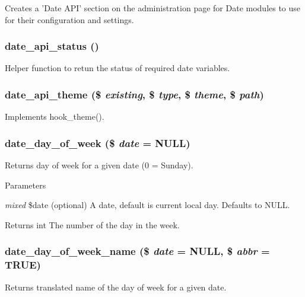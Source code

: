 Creates a 'Date API' section on the administration page for Date modules to use for their configuration and settings. \hypertarget{date__api_8module_a0dd6c7186e678394270216b9d241c729}{
\subsubsection[{date\_\-api\_\-status}]{\setlength{\rightskip}{0pt plus 5cm}date\_\-api\_\-status ()}}
\label{date__api_8module_a0dd6c7186e678394270216b9d241c729}
Helper function to retun the status of required date variables. \hypertarget{date__api_8module_a9a35f6b3d4939f8df7d17ba1758aff7f}{
\subsubsection[{date\_\-api\_\-theme}]{\setlength{\rightskip}{0pt plus 5cm}date\_\-api\_\-theme (\$ {\em existing}, \/  \$ {\em type}, \/  \$ {\em theme}, \/  \$ {\em path})}}
\label{date__api_8module_a9a35f6b3d4939f8df7d17ba1758aff7f}
Implements hook\_\-theme(). \hypertarget{date__api_8module_aeba2cb02e4bee3560f69941fa4b2337a}{
\subsubsection[{date\_\-day\_\-of\_\-week}]{\setlength{\rightskip}{0pt plus 5cm}date\_\-day\_\-of\_\-week (\$ {\em date} = {\ttfamily NULL})}}
\label{date__api_8module_aeba2cb02e4bee3560f69941fa4b2337a}
Returns day of week for a given date (0 = Sunday).


\begin{DoxyParams}{Parameters}
\item[{\em mixed}]\$date (optional) A date, default is current local day. Defaults to NULL.\end{DoxyParams}
\begin{DoxyReturn}{Returns}
int The number of the day in the week. 
\end{DoxyReturn}
\hypertarget{date__api_8module_a4d08b5abdf43cc6db86eb8ea3dfdbcba}{
\subsubsection[{date\_\-day\_\-of\_\-week\_\-name}]{\setlength{\rightskip}{0pt plus 5cm}date\_\-day\_\-of\_\-week\_\-name (\$ {\em date} = {\ttfamily NULL}, \/  \$ {\em abbr} = {\ttfamily TRUE})}}
\label{date__api_8module_a4d08b5abdf43cc6db86eb8ea3dfdbcba}
Returns translated name of the day of week for a given date.


